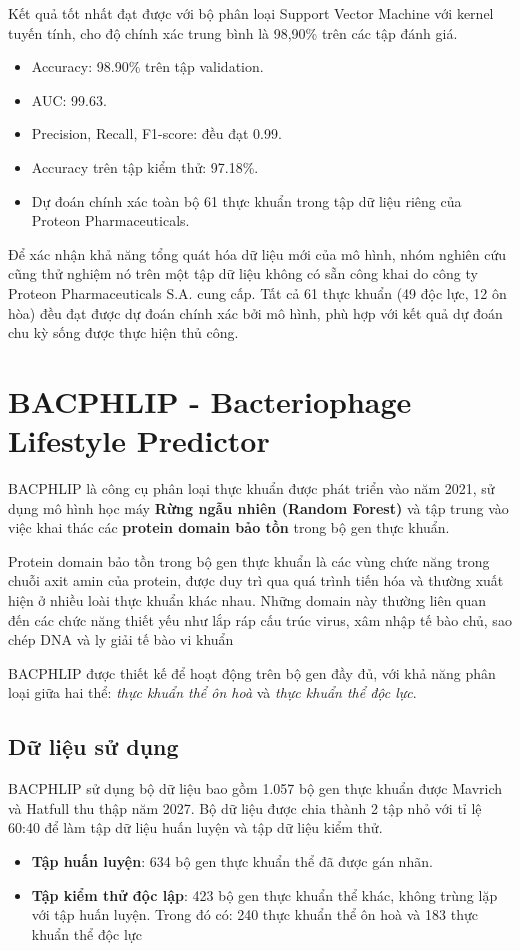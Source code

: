 Kết quả tốt nhất đạt được với bộ phân loại Support Vector Machine với kernel tuyến tính, cho độ chính xác trung bình là 98,90\% trên các tập đánh giá.
    \begin{itemize}
        \item Accuracy: 98.90\% trên tập validation.
        \item AUC: 99.63.
        \item Precision, Recall, F1-score: đều đạt 0.99.
        \item Accuracy trên tập kiểm thử: 97.18\%.
        \item Dự đoán chính xác toàn bộ 61 thực khuẩn trong tập dữ liệu riêng của Proteon Pharmaceuticals.
    \end{itemize}

Để xác nhận khả năng tổng quát hóa dữ liệu mới của mô hình, nhóm nghiên cứu cũng thử nghiệm nó trên một tập dữ liệu không có sẵn công khai do công ty Proteon Pharmaceuticals S.A. cung cấp. Tất cả 61 thực khuẩn (49 độc lực, 12 ôn hòa) đều đạt được dự đoán chính xác bởi mô hình, phù hợp với kết quả dự đoán chu kỳ sống được thực hiện thủ công.

\section{BACPHLIP - Bacteriophage Lifestyle Predictor \cite{BACPHLIP_Hockenberry2020.05.13.094805}}

BACPHLIP là công cụ phân loại thực khuẩn được phát triển vào năm 2021, sử dụng mô hình học máy \textbf{Rừng ngẫu nhiên (Random Forest)} và tập trung vào việc khai thác các \textbf{protein domain bảo tồn} trong bộ gen thực khuẩn. 

Protein domain bảo tồn trong bộ gen thực khuẩn là các vùng chức năng trong chuỗi axit amin của protein, được duy trì qua quá trình tiến hóa và thường xuất hiện ở nhiều loài thực khuẩn khác nhau. Những domain này thường liên quan đến các chức năng thiết yếu như lắp ráp cấu trúc virus, xâm nhập tế bào chủ, sao chép DNA và ly giải tế bào vi khuẩn

BACPHLIP được thiết kế để hoạt động trên bộ gen đầy đủ, với khả năng phân loại giữa hai thể: \textit{thực khuẩn thể ôn hoà} và \textit{thực khuẩn thể độc lực}.

\subsection*{Dữ liệu sử dụng}
BACPHLIP sử dụng bộ dữ liệu bao gồm 1.057 bộ gen thực khuẩn được Mavrich và Hatfull thu thập năm 2027. Bộ dữ liệu được chia thành 2 tập nhỏ với tỉ lệ 60:40 để làm tập dữ liệu huấn luyện và tập dữ liệu kiểm thử. 
\begin{itemize}
    \item \textbf{Tập huấn luyện}: 634 bộ gen thực khuẩn thể đã được gán nhãn.
    \item \textbf{Tập kiểm thử độc lập}: 423 bộ gen thực khuẩn thể khác, không trùng lặp với tập huấn luyện. Trong đó có: 240 thực khuẩn thể ôn hoà và 183 thực khuẩn thể độc lực
\end{itemize}

